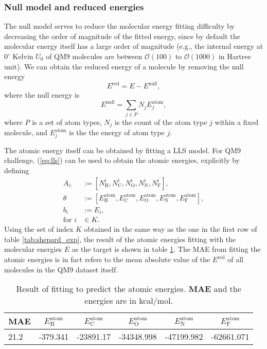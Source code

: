 \documentclass[12pt]{article}
\begin{document}
\subsubsection{Null model and reduced energies}
\label{subsubsec:ered}
The null model serves to reduce the molecular energy fitting difficulty by decreasing the order of magnitude of the fitted energy, since by default the molecular energy itself has a large order of magnitude (e.g., the internal energy at $0^{\circ}$ Kelvin $U_0$ of QM9 molecules are between $\mathcal{O}(100)$ to $\mathcal{O}(1000)$ in Hartree unit). We can obtain the reduced energy of a molecule by removing the null energy
\begin{equation}
	\label{eq:ered}
	E^\text{red} = E - E^\text{null},
\end{equation}
where the null energy is
\begin{equation}
	E^\text{null} = \sum_{j \in P} N_j E^\text{atom}_j,
\end{equation}
where $P$ is a set of atom types, $N_j$ is the count of the atom type $j$ within a fixed molecule, and $E^\text{atom}_j$ is the the energy of atom type $j$.

The atomic energy itself can be obtained by fitting a LLS model. For QM9 challenge, (\ref{eq:lls}) can be used to obtain the atomic energies, explicitly by defining
\begin{equation}
	\label{eq:enull2}
	\begin{split}
		A_{i:} &:= [N^i_\text{H}, N^i_\text{C}, N^i_\text{O}, N^i_\text{N}, N^i_\text{F}], \\
		\theta &:= [E^\text{atom}_\text{H}, E^\text{atom}_\text{C}, E^\text{atom}_\text{O}, E^\text{atom}_\text{N}, E^\text{atom}_\text{F}], \\
		b_i &:= E_i, \\
		\text{for }i &\in K.
	\end{split}
\end{equation}
Using the set of index $K$ obtained in the same way as the one in the first row of table \ref{tab:shepard_exp}, the result of the atomic energies fitting with the molecular energies $E$ as the target is shown in table \ref{tab:atomic_exp}. 
The MAE from fitting the atomic energies is in fact refers to the mean absolute value of the $E^\text{red}$ of all molecules in the QM9 dataset itself.

\begin{table}[H]
	\centering
	\caption{Result of fitting to predict the atomic energies. \textbf{MAE} and the energies are in kcal/mol.}
	\begin{tabular}{|l|l|l|l|l|l|}
		\hline
		\multicolumn{1}{|c|}{\textbf{MAE}} & \multicolumn{1}{c|}{$E^\text{atom}_\text{H}$} & \multicolumn{1}{c|}{$E^\text{atom}_\text{C}$} & \multicolumn{1}{c|}{$E^\text{atom}_\text{O}$} & \multicolumn{1}{c|}{$E^\text{atom}_\text{N}$} & \multicolumn{1}{c|}{$E^\text{atom}_\text{F}$} \\ \hline
		21.2  &	-379.341  & -23891.17 & -34348.998 & -47199.982 & -62661.071 \\ \hline
	\end{tabular}
	\label{tab:atomic_exp}
\end{table}
\end{document}
